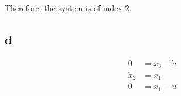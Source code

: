 \documentclass{article}
\begin{document}
Therefore, the system is of index 2. 

\subsection{d}

\begin{align*}
    0 &= x_3 - \dot u\\
    \dot x_2 &= x_1\\
    0 &= x_1 - u
\end{align*}






\end{document}
